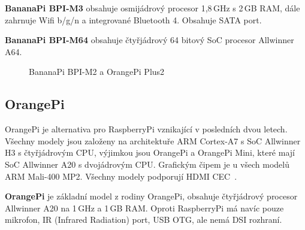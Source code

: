 	\textbf{BananaPi BPI-M3} obsahuje osmijádrový procesor 1,8\,GHz s 2\,GB RAM, dále zahrnuje Wifi b/g/n a integrované Bluetooth 4. Obsahuje SATA port.
	
	\textbf{BananaPi BPI-M64} obsahuje čtyřjádrový 64 bitový SoC procesor Allwinner A64.
	
	
	\begin{figure}[!ht]
	\vspace{-10pt}
    \centering
			\hspace*{5mm}
			\caption{BananaPi BPI-M2 a OrangePi Plus2}
			\vspace{-10pt}	
\end{figure}
	
	

	\subsection{OrangePi}
	OrangePi je alternativa pro RaspberryPi vznikající v posledních dvou letech. Všechny modely jsou založeny na architektuře ARM Cortex-A7 s SoC Allwinner H3 s čtyřjádrovým CPU, výjimkou jsou OrangePi a OrangePi Mini, které mají SoC Allwinner A20 s dvojádrovým CPU. Grafickým čipem je u všech modelů ARM Mali-400 MP2. Všechny modely podporují HDMI CEC~\cite{OrangePi}.

		\textbf{OrangePi} je základní model z rodiny OrangePi, obsahuje čtyřjádrový procesor Allwinner A20 na 1\,GHz a 1\,GB RAM. Oproti RaspberryPi má navíc pouze mikrofon, IR (Infrared Radiation) port, USB OTG, ale nemá DSI rozhraní.
		
